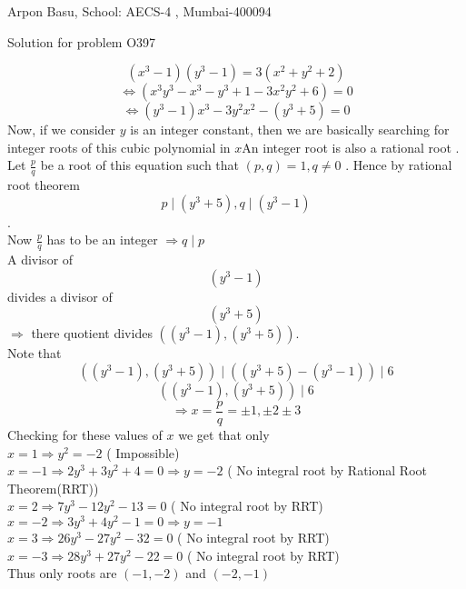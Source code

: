 \documentclass[10pt,a4paper]{extarticle}
\begin{document}
\begin{center}


Arpon Basu, School: AECS-4 , Mumbai-400094

Solution for problem O397
\end{center}

$$(x^3 -1)(y^3 -1)=3(x^2 + y^2 + 2)$$
$$\Leftrightarrow (x^3 y^3 - x^3 - y^3 +1-3x^2 y^2 + 6) = 0 $$
$$\Leftrightarrow (y^3 -1)x^3 -3y^2x^2 -(y^3+5)=0    $$
Now, if we consider $y$ is an integer constant, then we are basically searching for integer roots of this cubic polynomial in $x$An integer root is also a rational root
. Let $\frac{p}{q}$ be a root of this equation such that $(p,q)=1 , q \neq 0$ . Hence by rational root theorem 
$$ p  \mid (y^3 +5), q \mid (y^3 -1) $$. \\
Now $ \frac{p}{q} $ has to be an integer $ \Rightarrow q \mid p  $ \\
A divisor of $$(y^3 -1)$$ divides a divisor of $$(y^3 +5)$$ 
$ \Rightarrow$ there quotient divides $((y^3 -1),(y^3 +5))$. \\
Note that $$((y^3 -1),(y^3 +5))  \mid ((y^3 +5)-(y^3 -1)) \mid 6 $$
          $$((y^3 -1),(y^3 +5))  \mid 6$$
          $$ \Rightarrow   x=\frac{p}{q} = \pm 1 , \pm 2 \pm 3   $$ 
Checking for these values of $x$ we get that only \\
$x=1  \Rightarrow y^2 = -2 $ ( Impossible) \\
$x=-1 \Rightarrow 2y^3 + 3y^2+4 =0  \Rightarrow y=-2$ ( No integral root by Rational Root Theorem(RRT))\\
$x=2  \Rightarrow 7y^3 - 12y^2 -13 =0  $ ( No integral root by RRT) \\
$x=-2 \Rightarrow 3y^3 +4y^2 -1 =0  \Rightarrow y=-1$  \\
$x=3  \Rightarrow 26y^3 - 27y^2 -32 =0  $ ( No integral root by RRT) \\
$x=-3 \Rightarrow 28y^3 + 27y^2 -22 =0  $ ( No integral root by RRT) \\

Thus only roots are $(-1,-2)$ and $(-2,-1)$
          
\end{document}
